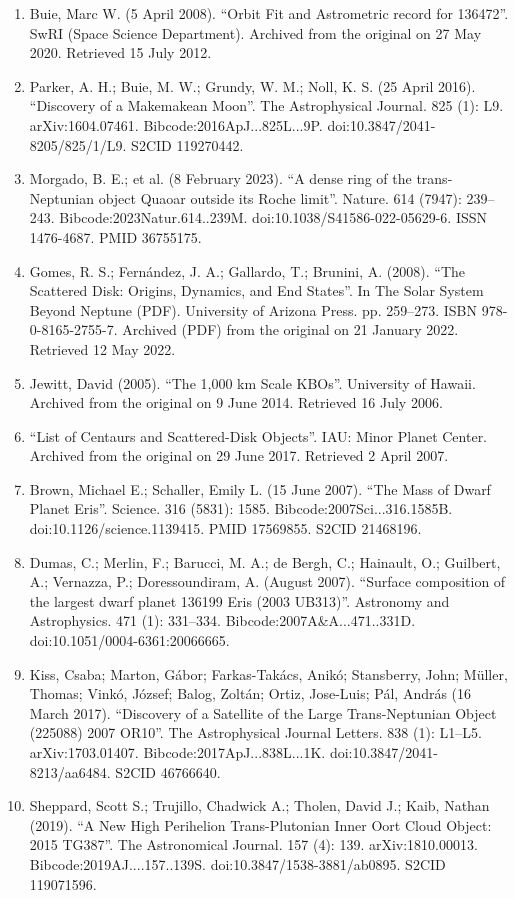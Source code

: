\begin{enumerate}
\item Buie, Marc W. (5 April 2008). ``Orbit Fit and Astrometric record for 136472''. SwRI (Space Science Department). Archived from the original on 27 May 2020. Retrieved 15 July 2012.
\item Parker, A. H.; Buie, M. W.; Grundy, W. M.; Noll, K. S. (25 April 2016). ``Discovery of a Makemakean Moon''. The Astrophysical Journal. 825 (1): L9. arXiv:1604.07461. Bibcode:2016ApJ...825L...9P. doi:10.3847/2041-8205/825/1/L9. S2CID 119270442.
\item Morgado, B. E.; et al. (8 February 2023). ``A dense ring of the trans-Neptunian object Quaoar outside its Roche limit''. Nature. 614 (7947): 239–243. Bibcode:2023Natur.614..239M. doi:10.1038/S41586-022-05629-6. ISSN 1476-4687. PMID 36755175.
\item Gomes, R. S.; Fernández, J. A.; Gallardo, T.; Brunini, A. (2008). ``The Scattered Disk: Origins, Dynamics, and End States''. In The Solar System Beyond Neptune (PDF). University of Arizona Press. pp. 259–273. ISBN 978-0-8165-2755-7. Archived (PDF) from the original on 21 January 2022. Retrieved 12 May 2022.
\item Jewitt, David (2005). ``The 1,000 km Scale KBOs''. University of Hawaii. Archived from the original on 9 June 2014. Retrieved 16 July 2006.
\item ``List of Centaurs and Scattered-Disk Objects''. IAU: Minor Planet Center. Archived from the original on 29 June 2017. Retrieved 2 April 2007.
\item Brown, Michael E.; Schaller, Emily L. (15 June 2007). ``The Mass of Dwarf Planet Eris''. Science. 316 (5831): 1585. Bibcode:2007Sci...316.1585B. doi:10.1126/science.1139415. PMID 17569855. S2CID 21468196.
\item Dumas, C.; Merlin, F.; Barucci, M. A.; de Bergh, C.; Hainault, O.; Guilbert, A.; Vernazza, P.; Doressoundiram, A. (August 2007). ``Surface composition of the largest dwarf planet 136199 Eris (2003 UB313)''. Astronomy and Astrophysics. 471 (1): 331–334. Bibcode:2007A\&A...471..331D. doi:10.1051/0004-6361:20066665.
\item Kiss, Csaba; Marton, Gábor; Farkas-Takács, Anikó; Stansberry, John; Müller, Thomas; Vinkó, József; Balog, Zoltán; Ortiz, Jose-Luis; Pál, András (16 March 2017). ``Discovery of a Satellite of the Large Trans-Neptunian Object (225088) 2007 OR10''. The Astrophysical Journal Letters. 838 (1): L1–L5. arXiv:1703.01407. Bibcode:2017ApJ...838L...1K. doi:10.3847/2041-8213/aa6484. S2CID 46766640.
\item Sheppard, Scott S.; Trujillo, Chadwick A.; Tholen, David J.; Kaib, Nathan (2019). ``A New High Perihelion Trans-Plutonian Inner Oort Cloud Object: 2015 TG387''. The Astronomical Journal. 157 (4): 139. arXiv:1810.00013. Bibcode:2019AJ....157..139S. doi:10.3847/1538-3881/ab0895. S2CID 119071596.

\end{enumerate}
